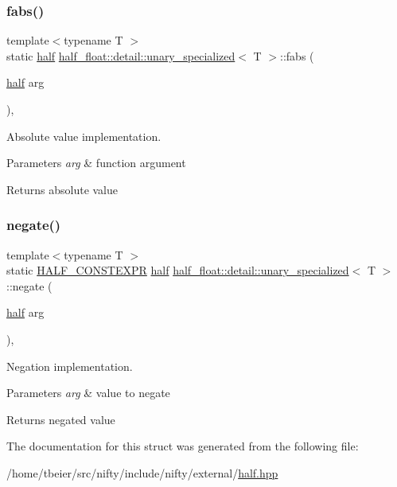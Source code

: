 \subsubsection{\texorpdfstring{fabs()}{fabs()}}
{\footnotesize\ttfamily template$<$typename T $>$ \\
static \hyperlink{classhalf__float_1_1half}{half} \hyperlink{structhalf__float_1_1detail_1_1unary__specialized}{half\+\_\+float\+::detail\+::unary\+\_\+specialized}$<$ T $>$\+::fabs (\begin{DoxyParamCaption}\item[{\hyperlink{classhalf__float_1_1half}{half}}]{arg }\end{DoxyParamCaption})\hspace{0.3cm}{\ttfamily [inline]}, {\ttfamily [static]}}

Absolute value implementation. 
\begin{DoxyParams}{Parameters}
{\em arg} & function argument \\
\hline
\end{DoxyParams}
\begin{DoxyReturn}{Returns}
absolute value 
\end{DoxyReturn}
\mbox{\label{structhalf__float_1_1detail_1_1unary__specialized_a6b8b9de170c31ccbcc6ef56ed9c488a1}} 
\subsubsection{\texorpdfstring{negate()}{negate()}}
{\footnotesize\ttfamily template$<$typename T $>$ \\
static \hyperlink{half_8hpp_ace3116a3e2cd66dd15780b92060987c7}{H\+A\+L\+F\+\_\+\+C\+O\+N\+S\+T\+E\+X\+PR} \hyperlink{classhalf__float_1_1half}{half} \hyperlink{structhalf__float_1_1detail_1_1unary__specialized}{half\+\_\+float\+::detail\+::unary\+\_\+specialized}$<$ T $>$\+::negate (\begin{DoxyParamCaption}\item[{\hyperlink{classhalf__float_1_1half}{half}}]{arg }\end{DoxyParamCaption})\hspace{0.3cm}{\ttfamily [inline]}, {\ttfamily [static]}}

Negation implementation. 
\begin{DoxyParams}{Parameters}
{\em arg} & value to negate \\
\hline
\end{DoxyParams}
\begin{DoxyReturn}{Returns}
negated value 
\end{DoxyReturn}


The documentation for this struct was generated from the following file\+:\begin{DoxyCompactItemize}
\item 
/home/tbeier/src/nifty/include/nifty/external/\hyperlink{half_8hpp}{half.\+hpp}\end{DoxyCompactItemize}
